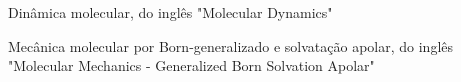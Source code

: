\documentclass[
	oldfontcommands,
	sumario=abnt-6027-2012,
	12pt,			%
	openright,		%
	oneside,		%
	a4paper,		%
	english,		%
	brazil			%
	]{imecc-unicamp}
\begin{document}

\listoffigures*
\cleardoublepage
\listoftables*
\cleardoublepage
\begin{siglas}
  \item[MD] Dinâmica molecular, do inglês "Molecular Dynamics"
  \item[MM-GBSA] Mecânica molecular por Born-generalizado e solvatação apolar, do inglês "Molecular Mechanics - Generalized Born Solvation Apolar"
\end{siglas}
\end{document}
